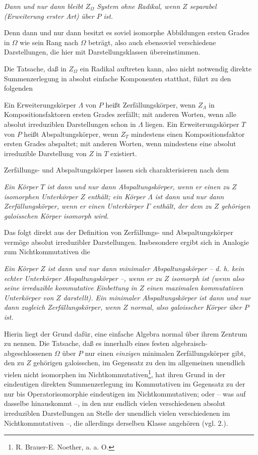 \noindent\emph{Dann und nur dann bleibt \(Z_\Omega\) System ohne Radikal, wenn \(Z\) separabel (Erweiterung erster Art) über \(P\) ist.}

Denn dann und nur dann besitzt es soviel isomorphe Abbildungen ersten Grades in \(\Omega\) wie sein Rang nach \(\Omega\) beträgt, also auch ebensoviel verschiedene Darstellungen, die hier mit Darstellungsklassen übereinstimmen.

Die Tatsache, daß in \(Z_\Omega\) ein Radikal auftreten kann, also nicht notwendig direkte Summenzerlegung in absolut einfache Komponenten statthat, führt zu den folgenden

\noindent\textbf{}\quad Ein Erweiterungskörper \(\Lambda\) von \(P\) heißt Zerfällungskörper, wenn \(Z_\Lambda\) in Kompositionsfaktoren ersten Grades zerfällt; mit anderen Worten, wenn alle absolut irreduziblen Darstellungen schon in \(\Lambda\) liegen. Ein Erweiterungskörper \(T\) von \(P\) heißt Abspaltungskörper, wenn \(Z_T\) mindestens einen Kompositionsfaktor ersten Grades abspaltet; mit anderen Worten, wenn mindestens eine absolut irreduzible Darstellung von \(Z\) in \(T\) existiert.

Zerfällungs- und Abspaltungskörper lassen sich charakterisieren nach dem

\noindent\textbf{} \emph{Ein Körper \(T\) ist dann und nur dann Abspaltungskörper, wenn er einen zu \(Z\) isomorphen Unterkörper \(Z\) enthält; ein Körper \(\Lambda\) ist dann und nur dann Zerfällungskörper, wenn er einen Unterkörper \(\Gamma\) enthält, der dem zu \(Z\) gehörigen galoisschen Körper isomorph wird.}

Das folgt direkt aus der Definition von Zerfällungs- und Abspaltungskörper vermöge absolut irreduzibler Darstellungen. Insbesondere ergibt sich in Analogie zum Nichtkommutativen die

\noindent\textbf{} \emph{Ein Körper \(Z\) ist dann und nur dann minimaler Abspaltungskörper -- d. h. kein echter Unterkörper Abspaltungskörper --, wenn er zu \(Z\) isomorph ist (wenn also seine irreduzible kommutative Einbettung in \(Z\) einen maximalen kommutativen Unterkörper von \(Z\) darstellt). Ein minimaler Abspaltungskörper ist dann und nur dann zugleich Zerfällungskörper, wenn \(Z\) normal, also galoisscher Körper über \(P\) ist.}

Hierin liegt der Grund dafür, eine einfache Algebra normal über ihrem Zentrum zu nennen. Die Tatsache, daß es innerhalb eines festen algebraisch-abgeschlossenen \(\Omega\) über \(P\) nur einen \emph{einzigen} minimalen Zerfällungskörper gibt, den zu \(Z\) gehörigen galoisschen, im Gegensatz zu den im allgemeinen unendlich vielen nicht isomorphen im Nichtkommutativen\footnote{R. Brauer-E. Noether, a. a. O.}, hat ihren Grund in der eindeutigen direkten Summenzerlegung im Kommutativen im Gegensatz zu der nur bis Operatorisomorphie eindeutigen im Nichtkommutativen; oder -- was auf dasselbe hinauskommt --, in den nur endlich vielen verschiedenen absolut irreduziblen Darstellungen an Stelle der unendlich vielen verschiedenen im Nichtkommutativen --, die allerdings derselben Klasse angehören (vgl. 2.).

